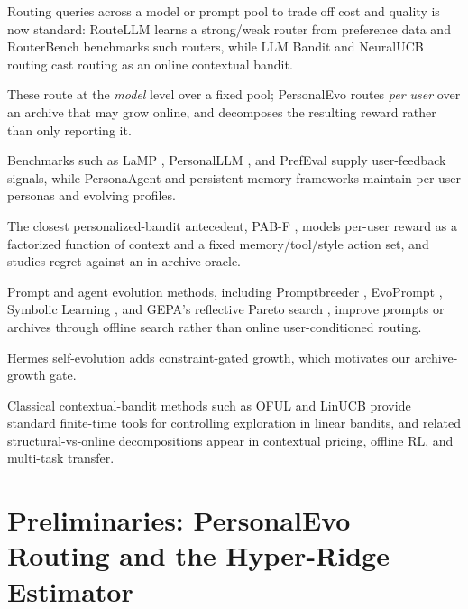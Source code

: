 \documentclass{article} %
\begin{document}
\label{sec:related}

Routing queries across a model or prompt pool to trade off cost and quality is now standard: RouteLLM \citep{ong2024routellm} learns a strong/weak router from preference data and RouterBench \citep{hu2024routerbench} benchmarks such routers, while LLM Bandit \citep{li2025llmbandit} and NeuralUCB routing \citep{tsai2026neuralucb} cast routing as an online contextual bandit.

These route at the \emph{model} level over a fixed pool; PersonalEvo routes \emph{per user} over an archive that may grow online, and decomposes the resulting reward rather than only reporting it.

Benchmarks such as LaMP \citep{salemi2023lamp}, PersonalLLM \citep{zollo2024personalllm}, and PrefEval \citep{zhao2025prefeval} supply user-feedback signals, while PersonaAgent \citep{zhang2025personaagent} and persistent-memory frameworks \citep{westhausser2025persistent} maintain per-user personas and evolving profiles.

The closest personalized-bandit antecedent, PAB-F \citep{jin2026personalizing}, models per-user reward as a factorized function of context and a fixed memory/tool/style action set, and studies regret against an in-archive oracle.

Prompt and agent evolution methods, including Promptbreeder \citep{fernando2023promptbreeder}, EvoPrompt \citep{guo2024evoprompt}, Symbolic Learning \citep{zhou2024symbolic}, and GEPA's reflective Pareto search \citep{agrawal2025geparp}, improve prompts or archives through offline search rather than online user-conditioned routing.

Hermes self-evolution \citep{hermes_selfevolution,hermes_agent} adds constraint-gated growth, which motivates our archive-growth gate.

Classical contextual-bandit methods such as OFUL and LinUCB \citep{abbasi2011oful,chu2011linucb,li2010contextual} provide standard finite-time tools for controlling exploration in linear bandits, and related structural-vs-online decompositions appear in contextual pricing, offline RL, and multi-task transfer.

\section{Preliminaries: PersonalEvo Routing and the Hyper-Ridge Estimator}
\label{sec:background}

\label{sec:method}
\end{document}
